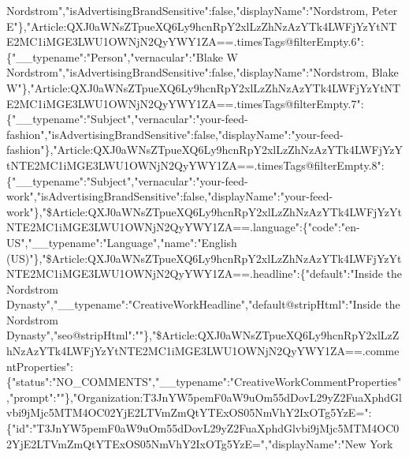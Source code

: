 Nordstrom","isAdvertisingBrandSensitive":false,"displayName":"Nordstrom,
Peter
E"\},"Article:QXJ0aWNsZTpueXQ6Ly9hcnRpY2xlLzZhNzAzYTk4LWFjYzYtNTE2MC1iMGE3LWU1OWNjN2QyYWY1ZA==.timesTags@filterEmpty.6":\{"\_\_typename":"Person","vernacular":"Blake
W
Nordstrom","isAdvertisingBrandSensitive":false,"displayName":"Nordstrom,
Blake
W"\},"Article:QXJ0aWNsZTpueXQ6Ly9hcnRpY2xlLzZhNzAzYTk4LWFjYzYtNTE2MC1iMGE3LWU1OWNjN2QyYWY1ZA==.timesTags@filterEmpty.7":\{"\_\_typename":"Subject","vernacular":"your-feed-fashion","isAdvertisingBrandSensitive":false,"displayName":"your-feed-fashion"\},"Article:QXJ0aWNsZTpueXQ6Ly9hcnRpY2xlLzZhNzAzYTk4LWFjYzYtNTE2MC1iMGE3LWU1OWNjN2QyYWY1ZA==.timesTags@filterEmpty.8":\{"\_\_typename":"Subject","vernacular":"your-feed-work","isAdvertisingBrandSensitive":false,"displayName":"your-feed-work"\},"\$Article:QXJ0aWNsZTpueXQ6Ly9hcnRpY2xlLzZhNzAzYTk4LWFjYzYtNTE2MC1iMGE3LWU1OWNjN2QyYWY1ZA==.language":\{"code":"en-US","\_\_typename":"Language","name":"English
(US)"\},"\$Article:QXJ0aWNsZTpueXQ6Ly9hcnRpY2xlLzZhNzAzYTk4LWFjYzYtNTE2MC1iMGE3LWU1OWNjN2QyYWY1ZA==.headline":\{"default":"Inside
the Nordstrom
Dynasty","\_\_typename":"CreativeWorkHeadline","default@stripHtml":"Inside
the Nordstrom
Dynasty","seo@stripHtml":""\},"\$Article:QXJ0aWNsZTpueXQ6Ly9hcnRpY2xlLzZhNzAzYTk4LWFjYzYtNTE2MC1iMGE3LWU1OWNjN2QyYWY1ZA==.commentProperties":\{"status":"NO\_COMMENTS","\_\_typename":"CreativeWorkCommentProperties","prompt":""\},"Organization:T3JnYW5pemF0aW9uOm55dDovL29yZ2FuaXphdGlvbi9jMjc5MTM4OC02YjE2LTVmZmQtYTExOS05NmVhY2IxOTg5YzE=":\{"id":"T3JnYW5pemF0aW9uOm55dDovL29yZ2FuaXphdGlvbi9jMjc5MTM4OC02YjE2LTVmZmQtYTExOS05NmVhY2IxOTg5YzE=","displayName":"New
York
